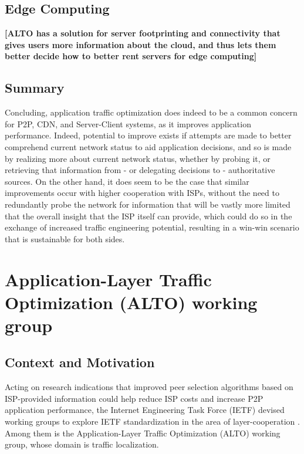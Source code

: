         \subsection{Edge Computing}

        \textbf{[ALTO has a solution for server footprinting and connectivity that gives users more information about the cloud, and thus lets them better decide how to better rent servers for edge computing]}


        \subsection{Summary}

        Concluding, application traffic optimization does indeed to be a common concern for P2P, CDN, and Server-Client systems, as it improves application performance.
        Indeed, potential to improve exists if attempts are made to better comprehend current network status to aid application decisions, and so is made by realizing more about current network status, whether by probing it, or retrieving that information from - or delegating decisions to - authoritative sources.
        On the other hand, it does seem to be the case that similar improvements occur with higher cooperation with ISPs, without the need to redundantly probe the network for information that will be vastly more limited that the overall insight that the ISP itself can provide, which could do so in the exchange of increased traffic engineering potential, resulting in a win-win scenario that is sustainable for both sides.

    \section{Application-Layer Traffic Optimization (ALTO) working group}

    \subsection{Context and Motivation}

        Acting on research indications that improved peer selection algorithms based on ISP-provided information could help reduce ISP costs and increase P2P application performance, the Internet Engineering Task Force (IETF) devised working groups to explore IETF standardization in the area of layer-cooperation \cite{seedorf2009}.
        Among them is the Application-Layer Traffic Optimization (ALTO) working group, whose domain is traffic localization.


